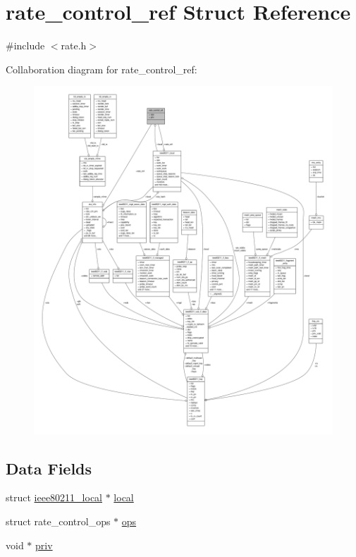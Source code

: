 \hypertarget{structrate__control__ref}{\section{rate\-\_\-control\-\_\-ref Struct Reference}
\label{structrate__control__ref}
}


{\ttfamily \#include $<$rate.\-h$>$}



Collaboration diagram for rate\-\_\-control\-\_\-ref\-:
\nopagebreak
\begin{figure}[H]
\begin{center}
\leavevmode
\includegraphics[width=350pt]{structrate__control__ref__coll__graph}
\end{center}
\end{figure}
\subsection*{Data Fields}
\begin{DoxyCompactItemize}
\item 
struct \hyperlink{structieee80211__local}{ieee80211\-\_\-local} $\ast$ \hyperlink{structrate__control__ref_ad436a024f420f219c4fe2eebce7e4ab2}{local}
\item 
struct rate\-\_\-control\-\_\-ops $\ast$ \hyperlink{structrate__control__ref_ab4edfb3119eea89ac8b10fb2b542f6f8}{ops}
\item 
void $\ast$ \hyperlink{structrate__control__ref_a8b6505c37d4ff95854b8b00527e4d9fa}{priv}
\end{DoxyCompactItemize}


